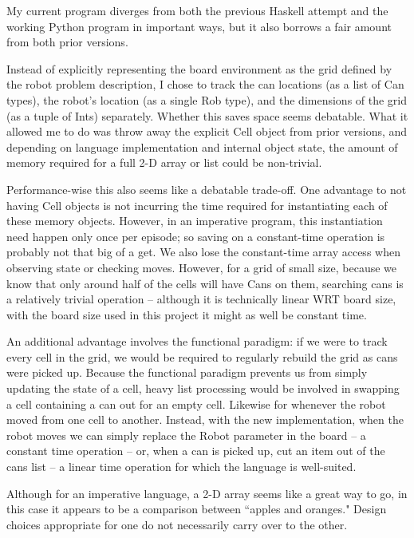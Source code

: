 \documentclass[12pt,a4paper]{article}
\begin{document}
		\par My current program diverges from both the previous Haskell attempt and the working Python program in important ways, but it also borrows a fair amount from both prior versions.
		\par Instead of explicitly representing the board environment as the grid defined by the robot problem description, I chose to track the can locations (as a list of Can types), the robot's location (as a single Rob type), and the dimensions of the grid (as a tuple of Ints) separately. Whether this saves space seems debatable. What it allowed me to do was throw away the explicit Cell object from prior versions, and depending on language implementation and internal object state, the amount of memory required for a full 2-D array or list could be non-trivial. 
		\par Performance-wise this also seems like a debatable trade-off. One advantage to not having Cell objects is not incurring the time required for instantiating each of these memory objects. However, in an imperative program, this instantiation need happen only once per episode; so saving on a constant-time operation is probably not that big of a get. We also lose the constant-time array access when observing state or checking moves. However, for a grid of small size, because we know that only around half of the cells will have Cans on them, searching cans is a relatively trivial operation -- although it is technically linear WRT board size, with the board size used in this project it might as well be constant time. 
		\par An additional advantage involves the functional paradigm: if we were to track every cell in the grid, we would be required to regularly rebuild the grid as cans were picked up. Because the functional paradigm prevents us from simply updating the state of a cell, heavy list processing would be involved in swapping a cell containing a can out for an empty cell. Likewise for whenever the robot moved from one cell to another. Instead, with the new implementation, when the robot moves we can simply replace the Robot parameter in the board -- a constant time operation -- or, when a can is picked up, cut an item out of the cans list -- a linear time operation for which the language is well-suited.
		\par Although for an imperative language, a 2-D array seems like a great way to go, in this case it appears to be a comparison between ``apples and oranges." Design choices appropriate for one do not necessarily carry over to the other.
\end{document}
